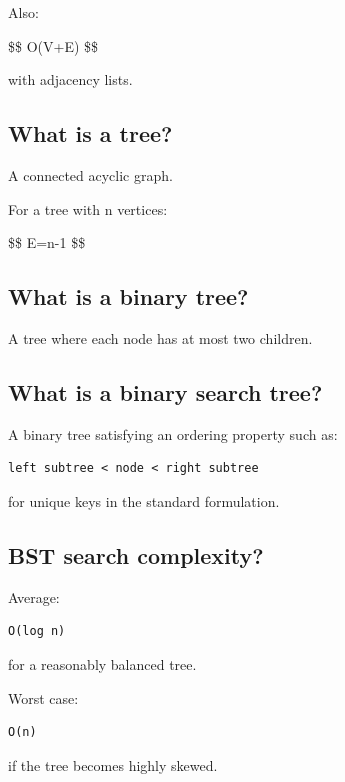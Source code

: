 Also:

\$\$
O(V+E)
\$\$

with adjacency lists.

\medskip

\subsection{What is a tree?}

A connected acyclic graph.

For a tree with n vertices:

\$\$
E=n-1
\$\$

\medskip

\subsection{What is a binary tree?}

A tree where each node has at most two children.

\medskip

\subsection{What is a binary search tree?}

A binary tree satisfying an ordering property such as:

\begin{lstlisting}
left subtree < node < right subtree
\end{lstlisting}

for unique keys in the standard formulation.

\medskip

\subsection{BST search complexity?}

Average:

\begin{lstlisting}
O(log n)
\end{lstlisting}

for a reasonably balanced tree.

Worst case:

\begin{lstlisting}
O(n)
\end{lstlisting}

if the tree becomes highly skewed.

\medskip

